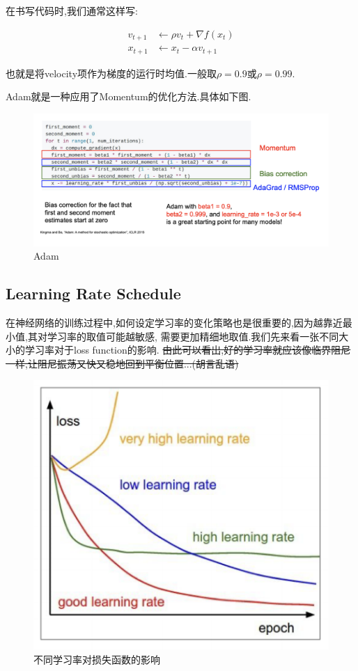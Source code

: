 在书写代码时,我们通常这样写:

\begin{equation}
	\begin{aligned}
		v_{t+1} &\leftarrow \rho v_{t} + \nabla f(x_t)
		\\
		x_{t+1} &\leftarrow x_t - \alpha v_{t+1}
	\end{aligned}
\end{equation}

也就是将velocity项作为梯度的运行时均值.一般取$\rho = 0.9$或$\rho = 0.99$.

Adam就是一种应用了Momentum的优化方法.具体如下图.

\begin{figure}[htbp]
	\centering
	\includegraphics[scale=0.65]{figures/adam.png}
	\caption{Adam}
\end{figure}

\subsection{Learning Rate Schedule}

在神经网络的训练过程中,如何设定学习率的变化策略也是很重要的,因为越靠近最小值,其对学习率的取值可能越敏感,
需要更加精细地取值.我们先来看一张不同大小的学习率对于loss function的影响.
\sout{由此可以看出,好的学习率就应该像临界阻尼一样,让阻尼振荡又快又稳地回到平衡位置...(胡言乱语)}

\begin{figure}[htbp]
	\centering
	\includegraphics[scale=0.65]{figures/learning_rate_schedule.png}
	\caption{不同学习率对损失函数的影响}
\end{figure}

